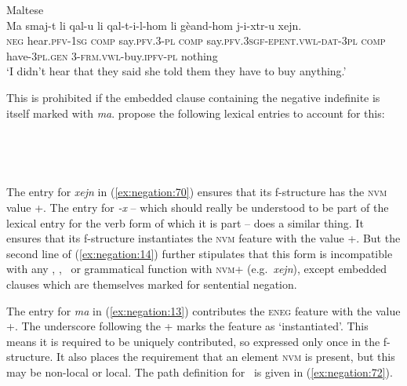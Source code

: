 \documentclass[output=paper,hidelinks]{langscibook}
\begin{document}
\ea\label{ex:negation:73}Maltese \citep [153]{camilleri-sadler:2017}\\
\gll Ma smaj-t li qal-u li qal-t-i-l-hom li gèand-hom j-i-xtr-u xejn.\\
\textsc{neg} hear.\textsc{pfv-1sg} \textsc{comp} say.\textsc{pfv.3-pl} \textsc{comp}  say.\textsc{pfv.3sgf-epent.vwl-dat-3pl} \textsc{comp}  have-\textsc{3pl.gen}  \textsc{3-frm.vwl}-buy.\textsc{ipfv-pl} nothing\\
\glt `I didn’t hear that they said she told them they have to buy anything.'
\z

This is prohibited if the embedded clause containing the negative indefinite is itself marked with \emph{ma}. \citet {camilleri-sadler:2017} propose the following lexical entries to account for this:

\ea
\label{ex:negation:70}
 \\
\citep [159]{camilleri-sadler:2017}
\z

\ea
\label{ex:negation:14}
\\
\citep [160]{camilleri-sadler:2017}
\z
  
The entry for \emph{xejn} in (\ref{ex:negation:70}) ensures that its f-structure has the \textsc{nvm} value +. The entry for \emph{-x} -- which should really be understood to be part of the lexical entry for the verb form of which it is part -- does a similar thing. It ensures that its f-structure instantiates the \textsc{nvm} feature with the value +. But the second line of (\ref{ex:negation:14}) further stipulates that this form is incompatible with any \XCOMP, \COMP, \ADJ\ or grammatical function with \textsc{nvm}+ (e.g.\ \emph{xejn}), except embedded clauses which are themselves marked for sentential negation.  

The entry for \emph{ma} in (\ref{ex:negation:13}) contributes the \textsc{eneg} feature with the value +. The underscore following the + marks the feature as `instantiated'. This means it is required to be uniquely contributed, so expressed only once in the f-structure. It also places the requirement that an element \textsc{nvm} is present, but this may be non-local or local. The path definition for \GF\ is given in (\ref{ex:negation:72}). 
 
\ea
\label{ex:negation:13}
\\
\citep [160]{camilleri-sadler:2017}
\z
  
\end{document}
